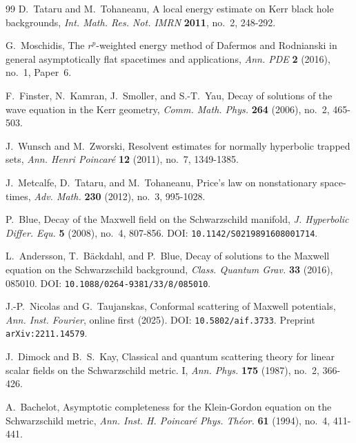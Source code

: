 \documentclass[11pt]{article}
\numberwithin{equation}{section}
\theoremstyle{plain}
\theoremstyle{definition}
\theoremstyle{remark}
\begin{document}
\begin{thebibliography}{99}
D.~Tataru and M.~Tohaneanu,
\newblock A local energy estimate on Kerr black hole backgrounds,
\newblock \emph{Int. Math. Res. Not. IMRN} \textbf{2011}, no.~2, 248-292.

G.~Moschidis,
\newblock The \(r^p\)-weighted energy method of Dafermos and Rodnianski in general asymptotically flat spacetimes and applications,
\newblock \emph{Ann. PDE} \textbf{2} (2016), no.~1, Paper~6.

F.~Finster, N.~Kamran, J.~Smoller, and S.-T.~Yau,
\newblock Decay of solutions of the wave equation in the Kerr geometry,
\newblock \emph{Comm. Math. Phys.} \textbf{264} (2006), no.~2, 465-503.

J.~Wunsch and M.~Zworski,
\newblock Resolvent estimates for normally hyperbolic trapped sets,
\newblock \emph{Ann. Henri Poincar\'e} \textbf{12} (2011), no.~7, 1349-1385.

J.~Metcalfe, D.~Tataru, and M.~Tohaneanu,
\newblock Price's law on nonstationary space-times,
\newblock \emph{Adv. Math.} \textbf{230} (2012), no.~3, 995-1028.

P.~Blue,
\newblock Decay of the Maxwell field on the Schwarzschild manifold,
\newblock \emph{J. Hyperbolic Differ. Equ.} \textbf{5} (2008), no.~4, 807-856.
\newblock DOI: \texttt{10.1142/S0219891608001714}.

L.~Andersson, T.~B\"ackdahl, and P.~Blue,
\newblock Decay of solutions to the Maxwell equation on the Schwarzschild background,
\newblock \emph{Class. Quantum Grav.} \textbf{33} (2016), 085010.
\newblock DOI: \texttt{10.1088/0264-9381/33/8/085010}.

J.-P.~Nicolas and G.~Taujanskas,
\newblock Conformal scattering of Maxwell potentials,
\newblock \emph{Ann. Inst. Fourier}, online first (2025).
\newblock DOI: \texttt{10.5802/aif.3733}. Preprint \texttt{arXiv:2211.14579}.

J.~Dimock and B.~S.~Kay,
\newblock Classical and quantum scattering theory for linear scalar fields on the Schwarzschild metric. I,
\newblock \emph{Ann. Phys.} \textbf{175} (1987), no.~2, 366-426.

A.~Bachelot,
\newblock Asymptotic completeness for the Klein-Gordon equation on the Schwarzschild metric,
\newblock \emph{Ann. Inst. H. Poincar\'e Phys. Th\'eor.} \textbf{61} (1994), no.~4, 411-441.


\end{thebibliography}
\end{document}
